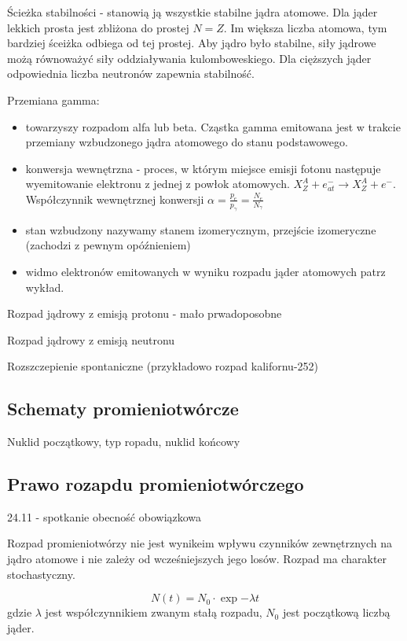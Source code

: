 \documentclass{article}
\begin{document}
Ścieżka stabilności - stanowią ją wszystkie stabilne jądra atomowe.
Dla jąder lekkich prosta jest zbliżona do prostej $N=Z$. Im większa liczba atomowa, tym bardziej śceiżka odbiega od tej prostej. Aby jądro było stabilne, siły jądrowe możą równoważyć siły oddziaływania kulomboweskiego. Dla cięższych jąder odpowiednia liczba neutronów zapewnia stabilność.

Przemiana gamma:
\begin{itemize}
    \item towarzyszy rozpadom alfa lub beta. Cząstka gamma emitowana jest w trakcie przemiany wzbudzonego jądra atomowego do stanu podstawowego.
    \item konwersja wewnętrzna - proces, w którym miejsce emisji fotonu następuje wyemitowanie elektronu z jednej z powłok atomowych. $X_Z^A + e_{at}^- \rightarrow X_Z^A + e^-$. Współczynnik wewnętrznej konwersji $\alpha = \frac{p_e}{p_{\gamma}} = \frac{N_e}{N_{\gamma}}$
    \item stan wzbudzony nazywamy stanem izomerycznym, przejście izomeryczne (zachodzi z pewnym opóźnieniem)
    \item widmo elektronów emitowanych w wyniku rozpadu jąder atomowych patrz wykład.
\end{itemize}

Rozpad jądrowy z emisją protonu - mało prwadoposobne

Rozpad jądrowy z emisją neutronu

Rozszczepienie spontaniczne (przykładowo rozpad kalifornu-252)

\subsection{Schematy promieniotwórcze}

Nuklid początkowy, typ ropadu, nuklid końcowy

\subsection{Prawo rozapdu promieniotwórczego}

24.11 - spotkanie obecność obowiązkowa

Rozpad promieniotwórzy nie jest wynikeim wpływu czynników zewnętrznych na jądro atomowe i nie zależy od wcześniejszych jego losów. Rozpad ma charakter stochastyczny.

\begin{equation}
    N(t) = N_0 \cdot \exp{-\lambda t}
\end{equation}
gdzie $\lambda$ jest współczynnikiem zwanym stałą rozpadu, $N_0$ jest początkową liczbą jąder.
\end{document}

